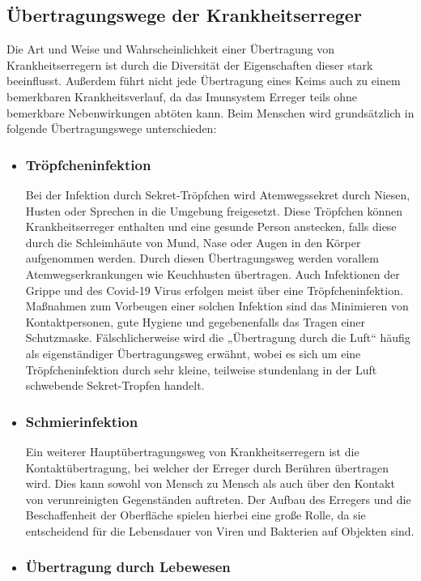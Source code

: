 \documentclass[12pt]{article}
\begin{document}
\subsection{Übertragungswege der Krankheitserreger}
Die Art und Weise und Wahrscheinlichkeit einer Übertragung von Krankheitserregern ist durch die Diversität der Eigenschaften dieser stark beeinflusst. Außerdem führt nicht jede Übertragung eines Keims auch zu einem bemerkbaren Krankheitsverlauf, da das Imunsystem Erreger teils ohne bemerkbare Nebenwirkungen abtöten kann. Beim Menschen wird grundsätzlich in folgende Übertragungswege unterschieden:
\begin{itemize}
    \item \subsubsection{Tröpfcheninfektion}
    Bei der Infektion durch Sekret-Tröpfchen wird Atemwegssekret durch Niesen, Husten oder Sprechen in die Umgebung freigesetzt. Diese Tröpfchen können Krankheitserreger enthalten und eine gesunde Person anstecken, falls diese durch die Schleimhäute von Mund, Nase oder Augen in den Körper aufgenommen werden. Durch diesen Übertragungsweg werden vorallem Atemwegserkrankungen wie Keuchhusten übertragen. Auch Infektionen der Grippe und des Covid-19 Virus erfolgen meist über eine Tröpfcheninfektion. Maßnahmen zum Vorbeugen einer solchen Infektion sind das Minimieren von Kontaktpersonen, gute Hygiene und gegebenenfalls das Tragen einer Schutzmaske.
    Fälschlicherweise wird die „Übertragung durch die Luft“ häufig als eigenständiger Übertragungsweg erwähnt, wobei es sich um eine Tröpfcheninfektion durch sehr kleine, teilweise stundenlang in der Luft schwebende Sekret-Tropfen handelt.
    \item \subsubsection{Schmierinfektion}
    Ein weiterer Hauptübertragungsweg von Krankheitserregern ist die Kontaktübertragung, bei welcher der Erreger durch Berühren übertragen wird. Dies kann sowohl von Mensch zu Mensch als auch über den Kontakt von verunreinigten Gegenständen auftreten. Der Aufbau des Erregers und die Beschaffenheit der Oberfläche spielen hierbei eine große Rolle, da sie entscheidend für die Lebensdauer von Viren und Bakterien auf Objekten sind.
    \item \subsubsection{Übertragung durch Lebewesen}

\end{itemize}
\end{document}
